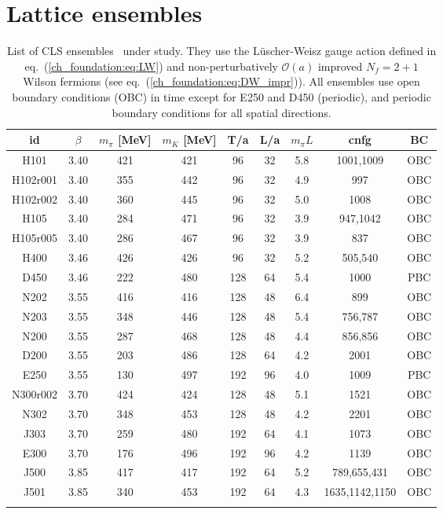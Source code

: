 
\chapter{Lattice ensembles}
\label{apex_ensembles}

\begin{longtable}{c c c c c c c c c}
\label{apex_ensembles:tab:ens}
    id & $\beta$ & $m_{\pi}$ [MeV] & $m_K$ [MeV] & T/a & L/a & $m_{\pi}L$ & cnfg & BC\\
    \toprule
    H101 & 3.40 & 421 & 421 & 96 & 32 & 5.8 & 1001,1009 & OBC \\
    H102r001 & 3.40 & 355 & 442 & 96 & 32 & 4.9 & 997 & OBC \\
    H102r002 & 3.40 & 360 & 445 & 96 & 32 & 5.0 & 1008 & OBC \\
    H105 & 3.40 & 284 & 471 & 96 & 32 & 3.9 & 947,1042 & OBC \\
    H105r005 & 3.40 & 286 & 467 & 96 & 32 & 3.9 & 837 & OBC \\
\midrule
    H400 & 3.46 & 426 & 426 & 96 & 32 & 5.2 & 505,540 & OBC \\
    D450 & 3.46 & 222 & 480 & 128 & 64 & 5.4 & 1000 & PBC \\
\midrule
    N202 & 3.55 & 416 & 416 & 128 & 48 & 6.4 & 899 & OBC \\
    N203 & 3.55 & 348 & 446 & 128 & 48 & 5.4 & 756,787 & OBC \\
    N200 & 3.55 & 287 & 468 & 128 & 48 & 4.4 & 856,856 & OBC \\
    D200 & 3.55 & 203 & 486 & 128 & 64 & 4.2 & 2001 & OBC \\
    E250 & 3.55 & 130 & 497 & 192 & 96 & 4.0 & 1009 & PBC\\
\midrule
    N300r002 & 3.70 & 424 & 424 & 128 & 48 & 5.1 & 1521 & OBC \\
    N302 & 3.70 & 348 & 453 & 128 & 48 & 4.2 & 2201 & OBC \\
    J303 & 3.70 & 259 & 480 & 192 & 64 & 4.1 & 1073 & OBC \\
    E300 & 3.70 & 176 & 496 & 192 & 96 & 4.2 & 1139 & OBC \\ 
\midrule
    J500 & 3.85 & 417 & 417 & 192 & 64 & 5.2 & 789,655,431 & OBC \\
    J501 & 3.85 & 340 & 453 & 192 & 64 & 4.3 & 1635,1142,1150 & OBC \\
    \bottomrule
    \caption{List of CLS ensembles~\citep{Bruno:2014jqa,Mohler:2017wnb} under study. They use the Lüscher-Weisz gauge action defined in eq.~(\ref{ch_foundation:eq:LW}) and non-perturbatively $\mathcal{O}(a)$ improved $N_f=2+1$ Wilson fermions (see eq.~(\ref{ch_foundation:eq:DW_impr})). All ensembles use open boundary conditions (OBC) in time except for E250 and D450 (periodic), and periodic boundary conditions for all spatial directions.}
\end{longtable}


